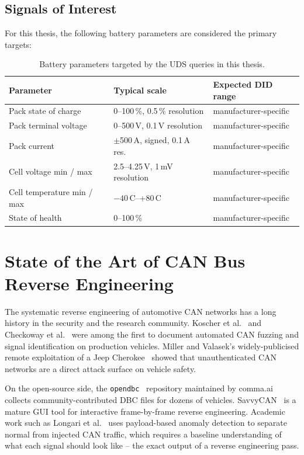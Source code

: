 \documentclass[11pt,a4paper,oneside,parskip=half]{scrreprt}
\begin{document}
\subsection{Signals of Interest}
For this thesis, the following battery parameters are considered the primary targets:

\begin{table}[H]
\caption{Battery parameters targeted by the UDS queries in this thesis.}
\label{tab:battery_signals}
\centering
\begin{tabular}{lp{4cm}l}
\toprule
\textbf{Parameter}           & \textbf{Typical scale}             & \textbf{Expected DID range} \\
\midrule
Pack state of charge         & 0--100\,\%, 0.5\,\% resolution     & manufacturer-specific \\
Pack terminal voltage        & 0--500\,V, 0.1\,V resolution       & manufacturer-specific \\
Pack current                 & $\pm$500\,A, signed, 0.1\,A res.   & manufacturer-specific \\
Cell voltage min / max       & 2.5--4.25\,V, 1\,mV resolution     & manufacturer-specific \\
Cell temperature min / max   & $-40$\,\textdegree{}C--+80\,\textdegree{}C & manufacturer-specific \\
State of health              & 0--100\,\%                         & manufacturer-specific \\
\bottomrule
\end{tabular}
\end{table}

\section{State of the Art of CAN Bus Reverse Engineering}
The systematic reverse engineering of automotive CAN networks has a long history in the security and the research community. Koscher et al.~\cite{koscher2010experimental} and Checkoway et al.~\cite{checkoway2011comprehensive} were among the first to document automated CAN fuzzing and signal identification on production vehicles. Miller and Valasek's widely-publicised remote exploitation of a Jeep Cherokee~\cite{miller2015remote} showed that unauthenticated CAN networks are a direct attack surface on vehicle safety.

On the open-source side, the \texttt{opendbc}~\cite{opendbc} repository maintained by comma.ai collects community-contributed DBC files for dozens of vehicles. SavvyCAN~\cite{savvycan} is a mature GUI tool for interactive frame-by-frame reverse engineering. Academic work such as Longari et al.~\cite{longari2020candito} uses payload-based anomaly detection to separate normal from injected CAN traffic, which requires a baseline understanding of what each signal should look like -- the exact output of a reverse engineering pass.
\end{document}

